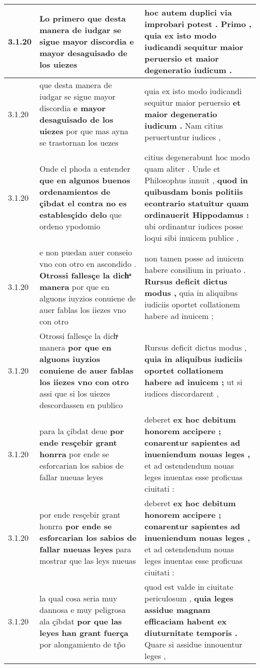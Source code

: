 \begin{tabular}{|p{1cm}|p{6.5cm}|p{6.5cm}|}
3.1.20 & Lo primero \textbf{ que desta manera de iudgar se sigue mayor discordia } e mayor desaguisado de los uiezes & hoc autem duplici via improbari potest . Primo , \textbf{ quia ex isto modo iudicandi sequitur maior peruersio } et maior degeneratio iudicum . \\\hline
3.1.20 & que desta manera de iudgar se sigue mayor discordia \textbf{ e mayor desaguisado de los uiezes } por que mas ayna se trastornan los uezes & quia ex isto modo iudicandi sequitur maior peruersio \textbf{ et maior degeneratio iudicum . } Nam citius peruertuntur iudices , \\\hline
3.1.20 & Onde el phoda a entender \textbf{ que en algunos buenos ordenamientos de çibdat el contra no es establesçido delo } que ordeno ypodomio & citius degenerabunt hoc modo quam aliter . Unde et Philosophus innuit , \textbf{ quod in quibusdam bonis politiis econtrario statuitur quam ordinauerit Hippodamus : } ubi ordinantur iudices posse loqui sibi inuicem publice , \\\hline
3.1.20 & e non puedan auer conseio vno con otro en ascondido . \textbf{ Otrossi fallesçe la dichͣ manera } por que en alguons iuyzios conuiene de auer fablas los iiezes vno con otro & non tamen posse ad inuicem habere consilium in priuato . \textbf{ Rursus deficit dictus modus , } quia in aliquibus iudiciis oportet collationem habere ad inuicem ; \\\hline
3.1.20 & Otrossi fallesçe la dichͣ manera \textbf{ por que en alguons iuyzios conuiene de auer fablas los iiezes vno con otro } assi que si los uiezes descordassen en publico & Rursus deficit dictus modus , \textbf{ quia in aliquibus iudiciis oportet collationem habere ad inuicem ; } ut si iudices discordarent , \\\hline
3.1.20 & para la çibdat deue \textbf{ por ende resçebir grant honrra } por ende se esforcarian los sabios de fallar nueuas leyes & deberet \textbf{ ex hoc debitum honorem accipere ; conarentur sapientes ad inueniendum nouas leges , } et ad ostendendum nouas leges inuentas esse proficuas ciuitati : \\\hline
3.1.20 & por ende resçebir grant honrra \textbf{ por ende se esforcarian los sabios de fallar nueuas leyes } para mostrar que las leys nueuas & deberet \textbf{ ex hoc debitum honorem accipere ; conarentur sapientes ad inueniendum nouas leges , } et ad ostendendum nouas leges inuentas esse proficuas ciuitati : \\\hline
3.1.20 & la qual cosa seria muy dannosa e muy peligrosa ala çibdat \textbf{ por que las leyes han grant fuerça } por alongamiento de tp̃o & quod est valde in ciuitate periculosum , \textbf{ quia leges assidue magnam efficaciam habent ex diuturnitate temporis . } Quare si assidue innouentur leges , \\\hline

\end{tabular}
